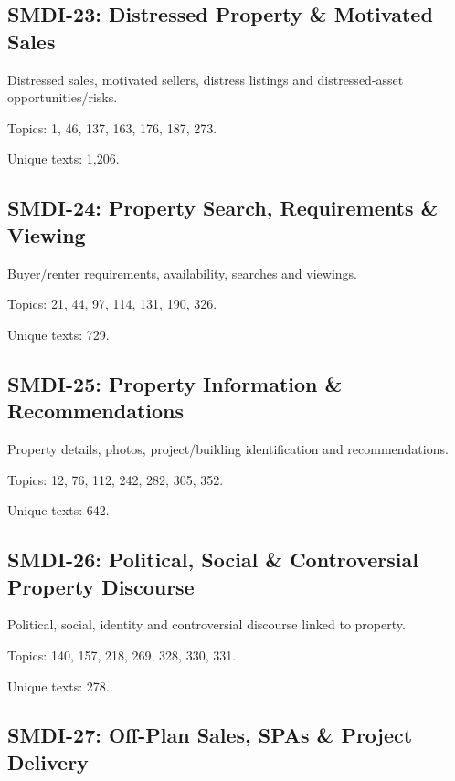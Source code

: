 \documentclass[10pt]{article}
\begin{document}
\subsection*{SMDI-23: Distressed Property \& Motivated Sales}

Distressed sales, motivated sellers, distress listings and distressed-asset opportunities/risks.

\par Topics: 1, 46, 137, 163, 176, 187, 273.

\par Unique texts: 1,206.

\subsection*{SMDI-24: Property Search, Requirements \& Viewing}

Buyer/renter requirements, availability, searches and viewings.

\par Topics: 21, 44, 97, 114, 131, 190, 326.

\par Unique texts: 729.

\subsection*{SMDI-25: Property Information \& Recommendations}

Property details, photos, project/building identification and recommendations.

\par Topics: 12, 76, 112, 242, 282, 305, 352.

\par Unique texts: 642.

\subsection*{SMDI-26: Political, Social \& Controversial Property Discourse}

Political, social, identity and controversial discourse linked to property.

\par Topics: 140, 157, 218, 269, 328, 330, 331.

\par Unique texts: 278.

\subsection*{SMDI-27: Off-Plan Sales, SPAs \& Project Delivery}
\end{document}
